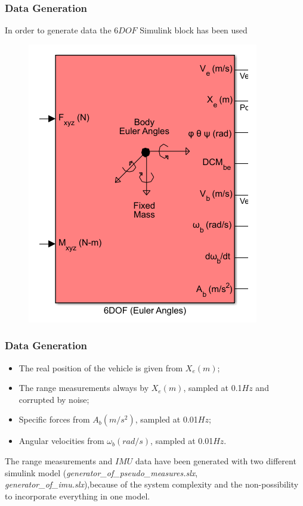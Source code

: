 \documentclass{beamer}
\begin{document}
	\begin{frame}
		\frametitle{Data Generation}
		In order to generate data the $6DOF$ Simulink block has been used
		\begin{figure}[H]
			\includegraphics[scale=0.4]{6DOF}
		\end{figure}
	\end{frame}
	
	\begin{frame}
		\frametitle{Data Generation}
		\begin{itemize}
			\item The real position of the vehicle is given from $X_e(m)$;
			\item The range measurements always by $X_e(m)$, sampled at 0.1$Hz$ and corrupted by noise;
			\item Specific forces from $A_b(m/s^2)$, sampled at 0.01$Hz$;
			\item Angular velocities from $\omega_b(rad/s)$, sampled at 0.01$Hz$.
		\end{itemize}
		
		The range measurements and $IMU$ data have been generated with two different simulink model (\textit{generator\_of\_pseudo\_measures.slx}, \textit{generator\_of\_imu.slx}),because of the system complexity and the non-possibility to incorporate everything in one model.
	\end{frame}
\end{document}
